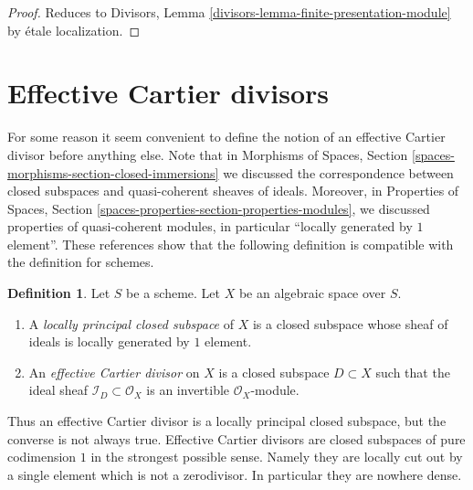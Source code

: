 \documentclass{stacks-project}
\theoremstyle{plain}
\theoremstyle{definition}
\newtheorem{definition}[subsection]{Definition}
\theoremstyle{remark}
\numberwithin{equation}{subsection}
\begin{document}
\begin{proof}
Reduces to
Divisors, Lemma \ref{divisors-lemma-finite-presentation-module}
by \'etale localization.
\end{proof}














\section{Effective Cartier divisors}
\label{section-effective-Cartier-divisors}

\noindent
For some reason it seem convenient to define the notion of an effective
Cartier divisor before anything else. Note that in
Morphisms of Spaces, Section \ref{spaces-morphisms-section-closed-immersions}
we discussed the correspondence between closed subspaces and quasi-coherent
sheaves of ideals. Moreover, in
Properties of Spaces, Section
\ref{spaces-properties-section-properties-modules}, we discussed properties
of quasi-coherent modules, in particular ``locally generated by $1$ element''.
These references show that the following definition is
compatible with the definition for schemes.

\begin{definition}
\label{definition-effective-Cartier-divisor}
Let $S$ be a scheme. Let $X$ be an algebraic space over $S$.
\begin{enumerate}
\item A {\it locally principal closed subspace} of $X$ is a closed subspace
whose sheaf of ideals is locally generated by $1$ element.
\item An {\it effective Cartier divisor} on $X$ is a closed subspace
$D \subset X$ such that the ideal sheaf $\mathcal{I}_D \subset \mathcal{O}_X$
is an invertible $\mathcal{O}_X$-module.
\end{enumerate}
\end{definition}

\noindent
Thus an effective Cartier divisor is a locally principal closed subspace,
but the converse is not always true. Effective Cartier divisors are closed
subspaces of pure codimension $1$ in the strongest possible sense. Namely
they are locally cut out by a single element which is not a zerodivisor.
In particular they are nowhere dense.
\end{document}
